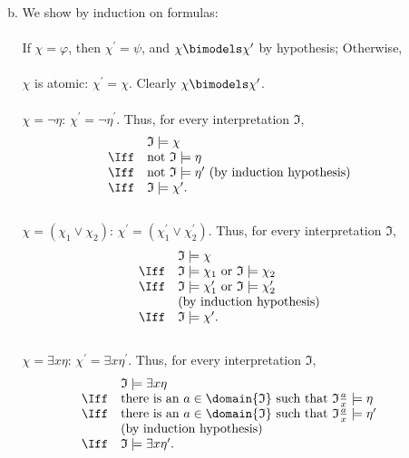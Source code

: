 \begin{enumerate}[1.]
\begin{enumerate}[(a)]
\[\]
\item We show by induction on formulas:\\
\ 
\\If $\chi = \varphi$, then $\chi^\prime = \psi$, and $\chi \bimodels \chi^\prime$ by hypothesis; Otherwise, \\
\ 
\\$\chi$ is atomic: $\chi^\prime = \chi$. Clearly $\chi \bimodels \chi^\prime$.\\
\ 
\\$\chi = \neg \eta$: $\chi^\prime = \neg \eta^\prime$. Thus, for every interpretation $\mathfrak{I}$,
\[
\begin{array}{ll}
\, & \mathfrak{I} \models \chi \\
\Iff & \mbox{not $\mathfrak{I} \models \eta$} \\
\Iff & \mbox{not $\mathfrak{I} \models \eta^\prime$ (by induction hypothesis)} \\
\Iff & \mathfrak{I} \models \chi^\prime .
\end{array}
\]
\ 
\\$\chi = ( \chi_1 \lor \chi_2 )$: $\chi^\prime = ( \chi_1^\prime \lor \chi_2^\prime )$. Thus, for every interpretation $\mathfrak{I}$,
\[
\begin{array}{ll}
\,  & \mathfrak{I} \models \chi \\
\Iff & \mbox{$\mathfrak{I} \models \chi_1$ or $\mathfrak{I} \models \chi_2$} \\
\Iff & \mbox{$\mathfrak{I} \models \chi_1^\prime$ or $\mathfrak{I} \models \chi_2^\prime$} \\
\,  & \mbox{(by induction hypothesis)} \\
\Iff & \mathfrak{I} \models \chi^\prime.
\end{array}
\]
\ 
\\$\chi = \exists x \eta$: $\chi^\prime = \exists x \eta^\prime$. Thus, for every interpretation $\mathfrak{I}$,
\[
\begin{array}{ll}
\,  & \mathfrak{I} \models \exists x \eta \\
\Iff & \mbox{there is an $a \in \domain{\mathfrak{I}}$ such that $\mathfrak{I} \frac{a}{x} \models \eta$} \\
\Iff & \mbox{there is an $a \in \domain{\mathfrak{I}}$ such that $\mathfrak{I} \frac{a}{x} \models \eta^\prime$} \\
\,  & \mbox{(by induction hypothesis)} \\
\Iff & \mathfrak{I} \models \exists x \eta^\prime.
\end{array}
\]
\end{enumerate}
\end{enumerate}

